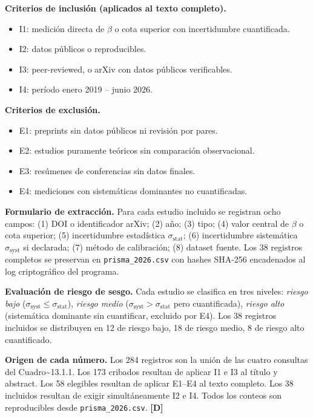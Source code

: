 ﻿\documentclass[11pt,letterpaper]{article}
\begin{document}
\textbf{Criterios de inclusión (aplicados al texto completo).}

\begin{itemize}[leftmargin=*]
\item I1: medición directa de $\beta$ o cota superior con incertidumbre cuantificada.
\item I2: datos públicos o reproducibles.
\item I3: peer-reviewed, o arXiv con datos públicos verificables.
\item I4: período enero 2019 -- junio 2026.
\end{itemize}

\textbf{Criterios de exclusión.}

\begin{itemize}[leftmargin=*]
\item E1: preprints sin datos públicos ni revisión por pares.
\item E2: estudios puramente teóricos sin comparación observacional.
\item E3: resúmenes de conferencias sin datos finales.
\item E4: mediciones con sistemáticas dominantes no cuantificadas.
\end{itemize}

\textbf{Formulario de extracción.} Para cada estudio incluido se registran ocho campos: (1) DOI o identificador arXiv; (2) año; (3) tipo; (4) valor central de $\beta$ o cota superior; (5) incertidumbre estadística $\sigma_{\text{stat}}$; (6) incertidumbre sistemática $\sigma_{\text{syst}}$ si declarada; (7) método de calibración; (8) dataset fuente. Los 38 registros completos se preservan en \texttt{prisma\_2026.csv} con hashes SHA-256 encadenados al log criptográfico del programa.

\textbf{Evaluación de riesgo de sesgo.} Cada estudio se clasifica en tres niveles: \emph{riesgo bajo} ($\sigma_{\text{syst}} \leq \sigma_{\text{stat}}$), \emph{riesgo medio} ($\sigma_{\text{syst}} > \sigma_{\text{stat}}$ pero cuantificada), \emph{riesgo alto} (sistemática dominante sin cuantificar, excluido por E4). Los 38 registros incluidos se distribuyen en 12 de riesgo bajo, 18 de riesgo medio, 8 de riesgo alto cuantificado.

\textbf{Origen de cada número.} Los 284 registros son la unión de las cuatro consultas del Cuadro\textasciitilde{}13.1.1. Los 173 cribados resultan de aplicar I1 e I3 al título y abstract. Los 58 elegibles resultan de aplicar E1--E4 al texto completo. Los 38 incluidos resultan de exigir simultáneamente I2 e I4. Todos los conteos son reproducibles desde \texttt{prisma\_2026.csv}. \textbf{[D]}
\end{document}
